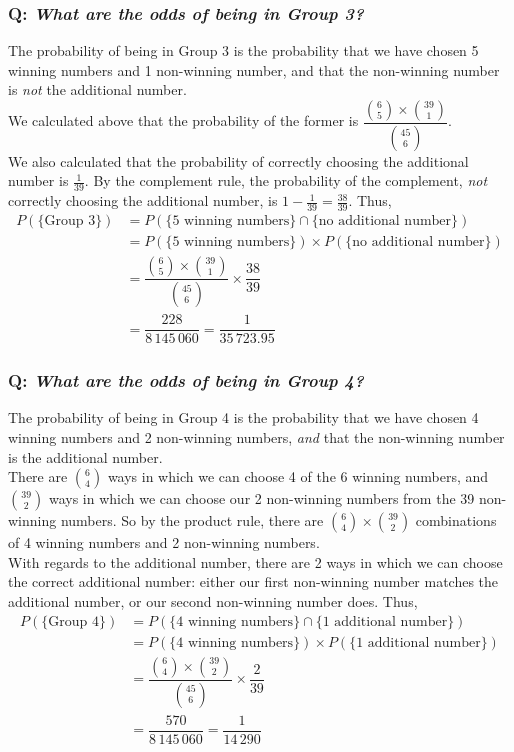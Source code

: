 \documentclass{article}
\begin{document}
\subsubsection*{Q: {\em What are the odds of being in Group 3?}}
The probability of being in Group 3 is the probability that we have chosen 5 winning numbers and 1 non-winning number, and that the non-winning number is \textit{not} the additional number.\\[1ex]
We calculated above that the probability of the former is $\dfrac{\binom{6}{5}\times\binom{39}{1}}{\binom{45}{6}}$.\\[1ex]
We also calculated that the probability of correctly choosing the additional number is $\frac{1}{39}$. By the complement rule, the probability of the complement, \textit{not} correctly choosing the additional number, is $1-\frac{1}{39}=\frac{38}{39}$. Thus,
\begin{align*}
P(\{\text{Group 3}\})& =P(\{\text{5 winning numbers}\}\cap\{\text{no additional number}\})\\
& =P(\{\text{5 winning numbers}\})\times P(\{\text{no additional number}\})\\
& =\dfrac{\binom{6}{5}\times\binom{39}{1}}{\binom{45}{6}}\times\dfrac{38}{39}\\
& =\dfrac{228}{8\,145\,060}=\dfrac{1}{35\,723.95}
\end{align*}

\subsubsection*{Q: {\em What are the odds of being in Group 4?}}
The probability of being in Group 4 is the probability that we have chosen 4 winning numbers and 2 non-winning numbers, \textit{and} that the non-winning number is the additional number.\\
There are $\binom{6}{4}$ ways in which we can choose 4 of the 6 winning numbers, and $\binom{39}{2}$ ways in which we can choose our 2 non-winning numbers from the 39 non-winning numbers. So by the product rule, there are $\binom{6}{4}\times\binom{39}{2}$ combinations of 4 winning numbers and 2 non-winning numbers.\\[1ex]
With regards to the additional number, there are 2 ways in which we can choose the correct additional number: either our first non-winning number matches the additional number, or our second non-winning number does. Thus,
\begin{align*}
P(\{\text{Group 4}\})& =P(\{\text{4 winning numbers}\}\cap\{\text{1 additional number}\})\\
& =P(\{\text{4 winning numbers}\})\times P(\{\text{1 additional number}\})\\
& =\dfrac{\binom{6}{4}\times\binom{39}{2}}{\binom{45}{6}}\times\dfrac{2}{39}\\
& =\dfrac{570}{8\,145\,060}=\dfrac{1}{14\,290}
\end{align*}
\end{document}
